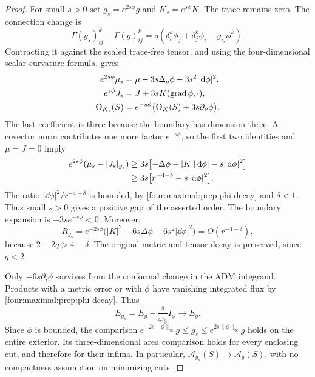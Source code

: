 \begin{proof}
For small \(s>0\) set
\(g_s=e^{2s\phi}g\) and \(K_s=e^{s\phi}K\).
The trace remains zero.  The connection change is
\[
 \Gamma(g_s)^k_{ij}-\Gamma(g)^k_{ij}
 =s(\delta_i^k\phi_j+\delta_j^k\phi_i-g_{ij}\phi^k).
\]
Contracting it against the scaled trace-free tensor, and using the
four-dimensional scalar-curvature formula, gives
\begin{equation}
\begin{split}
 e^{2s\phi}\mu_s
   &=\mu-3s\Delta_g\phi-3s^2|\,\mathrm d\phi|^2,\\
 e^{s\phi}J_s
   &=J+3sK(\operatorname{grad}\phi,\cdot),\\
 \Theta_{K_s}(S)
   &=e^{-s\phi}\bigl(\Theta_K(S)+3s\partial_\nu\phi\bigr).
\end{split}
\label{four:maximal:prep:conformal-constraints}
\end{equation}
The last coefficient is three because the boundary has dimension
three.  A covector norm contributes one more factor \(e^{-s\phi}\),
so the first two identities and \(\mu=J=0\) imply
\begin{align}
 e^{2s\phi}(\mu_s-|J_s|_{g_s})
 &\ge 3s\bigl[-\Delta\phi-|K||\,\mathrm d\phi|-s|\,\mathrm d\phi|^2\bigr]
 \notag\\
 &\ge3s\bigl[r^{-4-\delta}-s|\,\mathrm d\phi|^2\bigr].
\label{four:maximal:prep:strict-gap}
\end{align}
The ratio \(|\dd\phi|^2/r^{-4-\delta}\) is bounded, by
\eqref{four:maximal:prep:phi-decay} and \(\delta<1\).  Thus small \(s>0\)
gives a positive gap of the asserted order.  The boundary expansion
is \(-3s e^{-s\phi}<0\).  Moreover,
\[
 R_{g_s}=e^{-2s\phi}
 \bigl(|K|^2-6s\Delta\phi-6s^2|\dd\phi|^2\bigr)
       =O(r^{-4-\delta}),
\]
because \(2+2q>4+\delta\).  The original metric and tensor decay
is preserved, since \(q<2\).

Only \(-6s\partial_i\phi\) survives from the conformal change
in the ADM integrand.  Products with a metric error or with \(\phi\)
have vanishing integrated flux by \eqref{four:maximal:prep:phi-decay}.  Thus
\begin{equation}
 E_{g_s}=E_g-\frac{s}{\omega_3}I_\phi\longrightarrow E_g.
\label{four:maximal:prep:conformal-mass}
\end{equation}
Since \(\phi\) is bounded, the comparison
\(e^{-2s\|\phi\|_\infty}g\le g_s\le
e^{2s\|\phi\|_\infty}g\) holds on the entire exterior.  Its
three-dimensional area comparison holds for every enclosing cut,
and therefore for their infima.  In particular,
\(\mathcal A_{g_s}(S)\to\mathcal A_g(S)\), with no compactness assumption on
minimizing cuts.


\end{proof}
